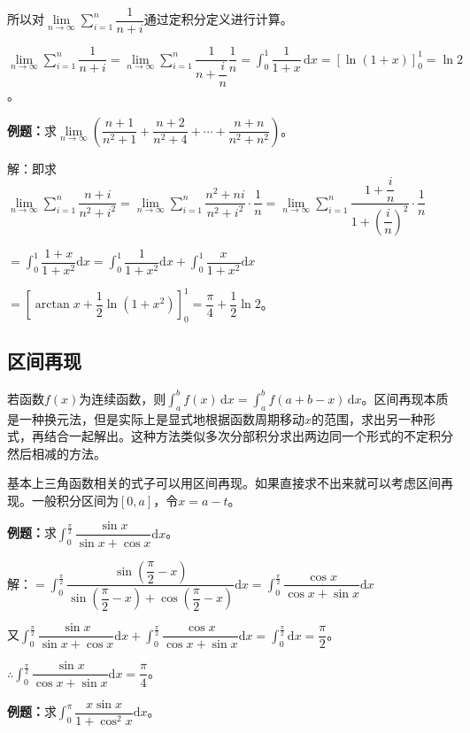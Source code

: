 \documentclass[UTF8, 12pt]{ctexart}
\begin{document}
所以对$\lim\limits_{n\to\infty}\sum\limits_{i=1}^n\dfrac{1}{n+i}$通过定积分定义进行计算。

$\lim\limits_{n\to\infty}\sum\limits_{i=1}^n\dfrac{1}{n+i}=\lim\limits_{n\to\infty}\sum\limits_{i=1}^n\dfrac{1}{n+\dfrac{i}{n}}\dfrac{1}{n}=\displaystyle{\int_0^1\dfrac{1}{1+x}\,\textrm{d}x}=[\ln(1+x)]_0^1=\ln2$。

\textbf{例题：}求$\lim\limits_{n\to\infty}\left(\dfrac{n+1}{n^2+1}+\dfrac{n+2}{n^2+4}+\cdots+\dfrac{n+n}{n^2+n^2}\right)$。

解：即求$\lim\limits_{n\to\infty}\sum\limits_{i=1}^n\dfrac{n+i}{n^2+i^2}=\lim\limits_{n\to\infty}\sum\limits_{i=1}^n\dfrac{n^2+ni}{n^2+i^2}\cdot\dfrac{1}{n}=\lim\limits_{n\to\infty}\sum\limits_{i=1}^n\dfrac{1+\dfrac{i}{n}}{1+\left(\dfrac{i}{n}\right)^2}\cdot\dfrac{1}{n}$

$=\displaystyle{\int_0^1\dfrac{1+x}{1+x^2}\textrm{d}x}=\displaystyle{\int_0^1\dfrac{1}{1+x^2}\textrm{d}x+\int_0^1\dfrac{x}{1+x^2}\textrm{d}x}$

$=\left[\arctan x+\dfrac{1}{2}\ln(1+x^2)\right]_0^1=\dfrac{\pi}{4}+\dfrac{1}{2}\ln2$。

\subsection{区间再现}

若函数$f(x)$为连续函数，则$\int_a^bf(x)\,\textrm{d}x=\int_a^bf(a+b-x)\,\textrm{d}x$。区间再现本质是一种换元法，但是实际上是显式地根据函数周期移动$x$的范围，求出另一种形式，再结合一起解出。这种方法类似多次分部积分求出两边同一个形式的不定积分然后相减的方法。

基本上三角函数相关的式子可以用区间再现。如果直接求不出来就可以考虑区间再现。一般积分区间为$[0,a]$，令$x=a-t$。

\textbf{例题：}求$\displaystyle{\int_0^\frac{\pi}{2}\dfrac{\sin x}{\sin x+\cos x}\textrm{d}x}$。

解：$=\displaystyle{\int_0^\frac{\pi}{2}\dfrac{\sin(\dfrac{\pi}{2}-x)}{\sin(\dfrac{\pi}{2}-x)+\cos(\dfrac{\pi}{2}-x)}\textrm{d}x=\int_0^\frac{\pi}{2}\dfrac{\cos x}{\cos x+\sin x}\textrm{d}x}$

又$\displaystyle{\int_0^\frac{\pi}{2}\dfrac{\sin x}{\sin x+\cos x}\textrm{d}x+\int_0^\frac{\pi}{2}\dfrac{\cos x}{\cos x+\sin x}\textrm{d}x}$$=\int_0^\frac{\pi}{2}\textrm{d}x=\dfrac{\pi}{2}$。

$\therefore\displaystyle{\int_0^\frac{\pi}{2}\dfrac{\sin x}{\cos x+\sin x}\textrm{d}x}=\dfrac{\pi}{4}$。

\textbf{例题：}求$\displaystyle{\int_0^\pi}\dfrac{x\sin x}{1+\cos^2x}\textrm{d}x$。
\end{document}
